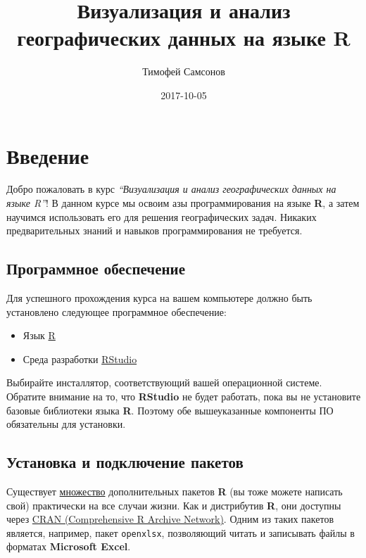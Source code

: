 \documentclass[]{book}
\title{Визуализация и анализ географических данных на языке R}
\author{Тимофей Самсонов}
\date{2017-10-05}
\providecommand{\tightlist}{%
  \setlength{\itemsep}{0pt}\setlength{\parskip}{0pt}}
\begin{document}
\maketitle

{
\setcounter{tocdepth}{1}
\tableofcontents
}
\chapter*{Введение}

Добро пожаловать в курс \emph{``Визуализация и анализ географических
данных на языке R''}! В данном курсе мы освоим азы программирования на
языке \textbf{R}, а затем научимся использовать его для решения
географических задач. Никаких предварительных знаний и навыков
программирования не требуется.

\section*{Программное обеспечение}\label{-}

Для успешного прохождения курса на вашем компьютере должно быть
установлено следующее программное обеспечение:

\begin{itemize}
\tightlist
\item
  Язык \href{https://cran.r-project.org}{R}
\item
  Среда разработки
  \href{https://www.rstudio.com/products/rstudio/download3/}{RStudio}
\end{itemize}

Выбирайте инсталлятор, соответствующий вашей операционной системе.
Обратите внимание на то, что \textbf{RStudio} не будет работать, пока вы
не установите базовые библиотеки языка \textbf{R}. Поэтому обе
вышеуказанные компоненты ПО обязательны для установки.

\section*{Установка и подключение пакетов}\label{---}

Существует \href{https://cran.r-project.org/web/packages/}{множество}
дополнительных пакетов \textbf{R} (вы тоже можете написать свой)
практически на все случаи жизни. Как и дистрибутив \textbf{R}, они
доступны через \href{https://cran.r-project.org}{CRAN (Comprehensive R
Archive Network)}. Одним из таких пакетов является, например, пакет
\texttt{openxlsx}, позволяющий читать и записывать файлы в форматах
\textbf{Microsoft Excel}.
\end{document}
